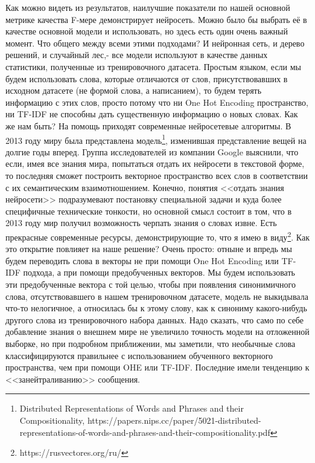 \documentclass{article}
\begin{document}
Как можно видеть из результатов, наилучшие показатели по нашей основной метрике качества F-мере демонстрирует нейросеть. Можно было бы выбрать её в качестве основной модели и использовать, но здесь есть один очень важный момент. Что общего между всеми этими подходами? И нейронная сеть, и дерево решений, и случайный лес,- все модели используют в качестве данных статистики, полученные из тренировочного датасета. Простым языком, если мы будем использовать слова, которые отличаются от слов, присутствовавших в исходном датасете (не формой слова, а написанием), то будем терять информацию с этих слов, просто потому что ни One Hot Encoding пространство, ни TF-IDF не способны дать существенную информацию о новых словах. Как же нам быть? На помощь приходят современные нейросетевые алгоритмы. 
В 2013 году миру была представлена модель\footnote{Distributed Representations of Words and Phrases and their Compositionality, https://papers.nips.cc/paper/5021-distributed-representations-of-words-and-phrases-and-their-compositionality.pdf}, изменившая представление вещей на долгие годы вперед. Группа исследователей из компании Google выяснили, что если, имея все знания мира, попытаться отдать их нейросети в текстовой форме, то последняя сможет построить векторное пространство всех слов в соответствии с их семантическим взаимотношением. Конечно, понятия <<отдать знания нейросети>> подразумевают постановку специальной задачи и куда более специфичные технические тонкости, но основной смысл состоит в том, что в 2013 году мир получил возможность черпать знания о словах извне. Есть прекрасные современные ресурсы, демонстрирующие то, что я имею в виду\footnote{https://rusvectores.org/ru/}. Как это открытие повлияет на наше решение? Очень просто: отныне и впредь мы будем переводить слова в векторы не при помощи One Hot Encoding или TF-IDF подхода, а при помощи предобученных векторов. Мы будем использовать эти предобученные вектора с той целью, чтобы при появления синонимичного слова, отсутствовавшего в нашем тренировочном датасете, модель не выкидывала что-то нелогичное, а относилась бы к этому слову, как к синониму какого-нибудь другого слова из тренировочного набора данных. Надо сказать, что само по себе добавление знания о внешнем мире не увеличило точность модели на отложенной выборке, но при подробном приближении, мы заметили, что необычные слова классифицируются правильнее с использованием обученного векторного пространства, чем при помощи OHE или TF-IDF. Последние имели тенденцию к <<занейтраливанию>> сообщения.
\end{document}
